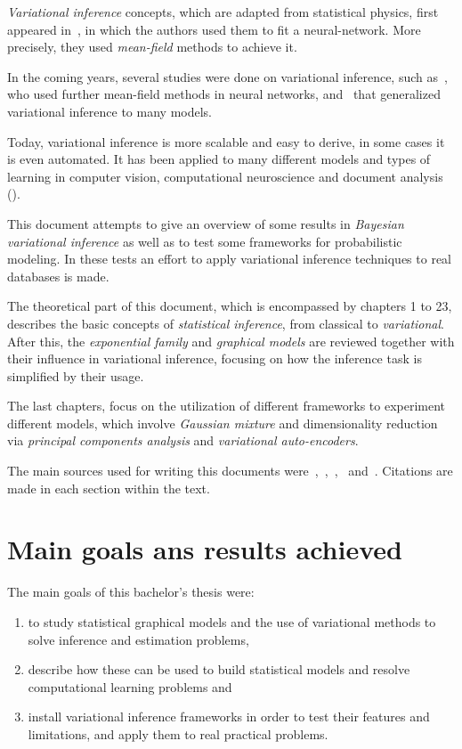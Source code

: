 
\emph{Variational inference} concepts, which are adapted from statistical physics, first appeared in~\cite{anderson1987mean}, in which the authors used them to fit a neural-network. More precisely, they used \emph{mean-field} methods to achieve it.

In the coming years, several studies were done on variational inference, such as~\cite{hinton1993keeping}, who used further mean-field methods in neural networks, and~\cite{jordan1999introduction} that generalized variational inference to many models.

Today, variational inference is more scalable and easy to derive, in some cases it is even automated. It has been applied to many different models and types of learning in computer vision, computational neuroscience and document analysis (\cite{blei2014build, blei2012probabilistic}).

This document attempts to give an overview of some results in \emph{Bayesian variational inference} as well as to test some frameworks for probabilistic modeling. In these tests an effort to apply variational inference techniques to real databases is made.

The theoretical part of this document, which is encompassed by chapters 1 to 23, describes the basic concepts of \emph{statistical inference}, from classical to \emph{variational}. After this, the \emph{exponential family} and \emph{graphical models} are reviewed together with their influence in variational inference, focusing on how the inference task is simplified by their usage.

The last chapters, focus on the utilization of different frameworks to experiment different models, which involve \emph{Gaussian mixture} and dimensionality reduction via \emph{principal components analysis} and \emph{variational auto-encoders}.

The main sources used for writing this documents were~\cite{barber},~\cite{bishop2006pattern},~\cite{koller_friedman},~\cite{masegosa2019probabilistic} and~\cite{blei2017variational}. Citations are made in each section within the text.

\section*{Main goals ans results achieved}

The main goals of this bachelor's thesis were:
\begin{enumerate}
  \item to study statistical graphical models and the use of variational methods to solve inference and estimation problems,
  \item describe how these can be used to build statistical models and resolve computational learning problems and
  \item install variational inference frameworks in order to test their features and limitations, and apply them to real practical problems.
\end{enumerate}

